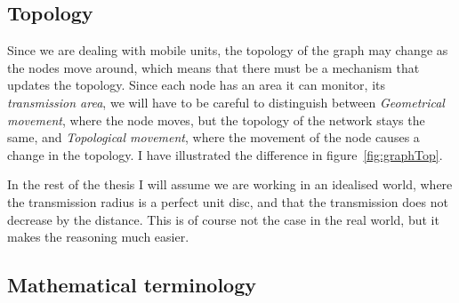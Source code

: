 \subsection{Topology}
\label{section:topology}

Since we are dealing with mobile units, the topology of the graph may change as the nodes move around, which means that there must be a mechanism that updates the topology. Since each node has an area it can monitor, its \emph{transmission area}, we will have to be careful to distinguish between \emph{Geometrical movement}, where the node moves, but the topology of the network stays the same, and \emph{Topological movement}, where the movement of the node causes a change in the topology. I have illustrated the difference in figure~\ref{fig:graphTop}.

In the rest of the thesis I will assume we are working in an idealised world, where the transmission radius is a perfect unit disc, and that the transmission does not decrease by the distance. This is of course not the case in the real world, but it makes the reasoning much easier.

\subsection{Mathematical terminology}
